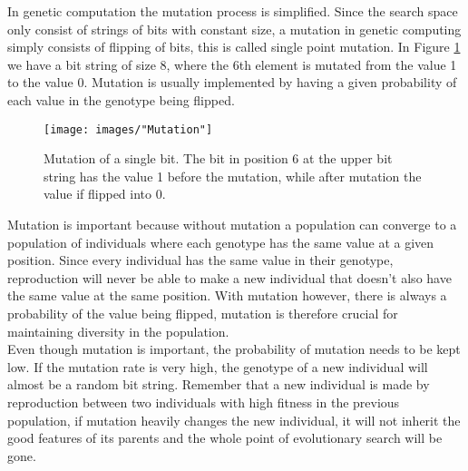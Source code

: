 \documentclass{article}
\begin{document}
\noindent In genetic computation the mutation process is simplified. Since the search space only consist of strings of bits with constant size, a mutation in genetic computing simply consists of flipping of bits, this is called single point mutation. In Figure \ref{Mutation} we have a bit string of size 8, where the 6th element is mutated from the value 1 to the value 0. Mutation is usually implemented by having a given probability of each value in the genotype being flipped.


\begin{figure}[h!]
\begin{center}
\texttt{[image: images/"Mutation"]}
\caption{Mutation of a single bit. The bit in position 6 at the upper bit string has the value 1 before the mutation, while after mutation the value if flipped into 0.}
\label{Mutation}
\end{center}
\end{figure}


Mutation is important because without mutation a population can converge to a population of individuals where each genotype has the same value at a given position. Since every individual has the same value in their genotype, reproduction will never be able to make a new individual that doesn't also have the same value at the same position. With mutation however, there is always a probability of the value being flipped, mutation is therefore crucial for maintaining diversity in the population.\\


\noindent Even though mutation is important, the probability of mutation needs to be kept low. If the mutation rate is very high, the genotype of a new individual will almost be a random bit string. Remember that a new individual is made by reproduction between two individuals with high fitness in the previous population, if mutation heavily changes the new individual, it will not inherit the good features of its parents and the whole point of evolutionary search will be gone.
\end{document}
